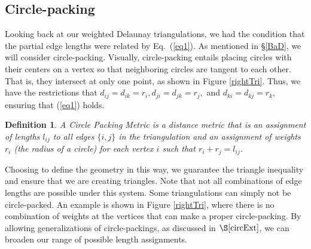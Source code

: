 \documentclass[12pt]{article}
\newtheorem{definition}[theorem]{Definition}
\begin{document}
\subsection{Circle-packing}

 Looking back at our weighted Delaunay triangulations, we had the condition that the partial edge lengths were related by Eq.~(\ref{eq1}). As mentioned in \S\ref{BaD}, we will consider circle-packing. Visually, circle-packing entails placing circles with their centers on a vertex so that neighboring circles are tangent to each other. That is, they intersect at only one point, as shown in Figure \ref{rightTri}. Thus, we have the restrictions that $d_{ij} = d_{ik} = r_i, d_{ji} = d_{jk} = r_j,$ and $d_{ki} = d_{kj} = r_k$, ensuring that (\ref{eq1}) holds.

\begin{definition}
A Circle Packing Metric is a distance metric that is an assignment of lengths $l_{ij}$ to all edges $\{i, j\}$ in the triangulation and an assignment of weights $r_i$ (the radius of a circle) for each vertex $i$ such that $r_i + r_j = l_{ij}$. 
\end{definition}

 Choosing to define the geometry in this way, we guarantee the triangle inequality and ensure that we are creating triangles. Note that not all combinations of edge lengths are possible under this system. Some triangulations can simply not be circle-packed. An example is shown in Figure \ref{rightTri}, where there is no combination of weights at the vertices that can make a proper circle-packing. By allowing generalizations of circle-packings, as discussed in $\S\ref{circExt}$, we can broaden our range of possible length assignments.
\end{document}
